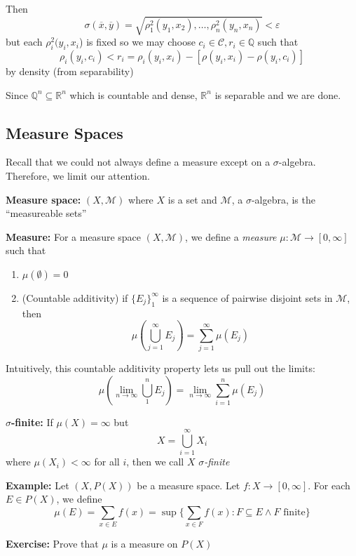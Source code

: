 \documentclass[12pt]{article}
\newcommand{\R}{\mathbb{R}}
\newcommand{\Q}{\mathbb{Q}}
\newcommand{\ep}{\varepsilon}
\newcommand{\M}{\mathcal{M}}
\newcommand{\sub}{\subseteq}
\renewcommand{\bar}[1]{\overline{#1}}
\newenvironment*{tbox}[2][gray]{
    \begin{tcolorbox}[
        parbox=false,
        colback=#1!5!white,
        colframe=#1!75!black,
        breakable,
        title={#2}
    ]}
    {\end{tcolorbox}}
\newenvironment*{exercise}[1][red]{
    \begin{tcolorbox}[
        parbox=false,
        colback=#1!5!white,
        colframe=#1!75!black,
        breakable
    ]}
    {\end{tcolorbox}}
\newenvironment*{proof}[1][blue]{
\begin{tcolorbox}[
    parbox=false,
    colback=#1!5!white,
    colframe=#1!75!black,
    breakable
]}
{\end{tcolorbox}}
\begin{document}
\begin{tbox}{\textbf{Proposition:} $B_{\R^n}$ is  }
\begin{proof}
            Then 
            \[\sigma(\bar x, \bar y) = \sqrt{\rho_1^2(y_1, x_2), \dots, \rho_n^2(y_n, x_n)} < \ep\]
            but each $\rho_i^2(y_i, x_i$) is fixed so we may choose $c_i \in \mathcal C, r_i \in \Q$ such that 
            \[\rho_i(y_i, c_i) < r_i = \rho_i(y_i, x_i) - [\rho(y_i, x_i) - \rho(y_i, c_i)]\]
            by density (from separability) 


        \end{proof}

        Since $\Q^n \sub \R^n$ which is countable and dense, $\R^n$ is separable and we are done. 
    \end{tbox}

    \subsection*{Measure Spaces}
        Recall that we could not always define a measure except on a $\sigma$-algebra. Therefore, we limit our attention.

        \textbf{Measure space:} $(X, \M)$ where $X$ is a set and $\M$, a $\sigma$-algebra, is the ``measureable sets''

        \textbf{Measure:} For a measure space $(X, \M)$, we define a \emph{measure} $\mu: \M \to [0, \infty]$ such that 
        \begin{enumerate}
            \item $\mu(\emptyset) = 0$
            \item (Countable additivity) if $\{E_j\}_1^{\infty}$ is a sequence of pairwise disjoint sets in $\M$, then 
            \[\mu\left(\bigcup_{j=1}^{\infty} E_j\right) = \sum_{j=1}^{\infty} \mu(E_j)\] 
        \end{enumerate}

        Intuitively, this countable additivity property lets us pull out the limits:
        \[\mu\left(\lim_{n \to \infty} \bigcup_{1}^n E_j\right) = \lim_{n\to \infty} \sum_{i=1}^n \mu(E_j)\] 

        \textbf{$\sigma$-finite:} If $\mu(X) = \infty$ but 
        \[X = \bigcup_{i=1}^{\infty} X_i\]
        where $\mu(X_i) < \infty$ for all $i$, then we call $X$ \emph{$\sigma$-finite}

        \textbf{Example:} Let $(X, P(X))$ be a measure space. Let $f: X \to [0, \infty]$. For each $E \in P(X)$, we define 
        \[\mu(E) = \sum_{x \in E} f(x) = \sup\{\sum_{x \in F} f(x): F \sub E \land F \text{ finite}\}\] 

        \begin{exercise}
            \textbf{Exercise:} Prove that $\mu$ is a measure on $P(X)$
        \end{exercise}
\end{document}
